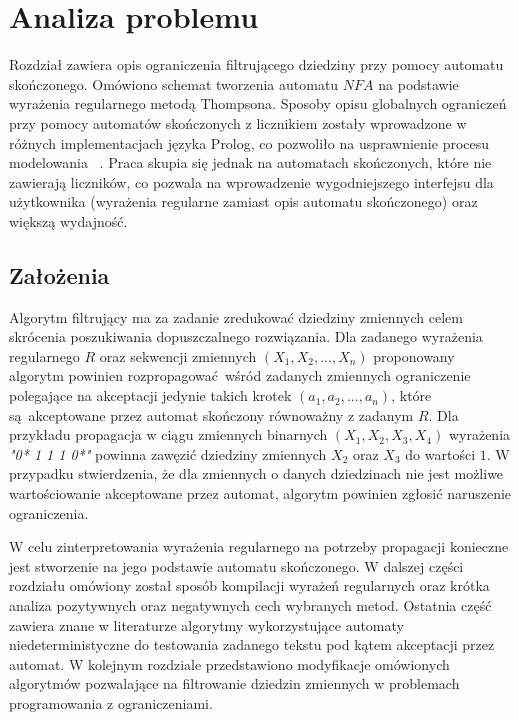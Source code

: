 \chapter{Analiza problemu}
\thispagestyle{chapterBeginStyle}
Rozdział zawiera opis ograniczenia filtrującego dziedziny przy pomocy automatu skończonego. Omówiono schemat tworzenia
automatu $NFA$ na podstawie wyrażenia regularnego metodą Thompsona. Sposoby opisu globalnych ograniczeń przy pomocy automatów
skończonych z licznikiem zostały wprowadzone w różnych implementacjach języka Prolog, co pozwoliło na usprawnienie procesu modelowania~
\cite{Automata}. Praca skupia się jednak na automatach skończonych, które nie zawierają liczników, co pozwala na wprowadzenie
wygodniejszego interfejsu dla użytkownika (wyrażenia regularne zamiast opis automatu skończonego) oraz większą wydajność.

\section{Założenia}
\par
Algorytm filtrujący ma za zadanie zredukować dziedziny zmiennych celem skrócenia poszukiwania dopuszczalnego rozwiązania.
Dla zadanego wyrażenia regularnego $R$ oraz sekwencji zmiennych $(X_1, X_2, ... , X_n)$ proponowany algorytm
powinien rozpropagować wśród zadanych zmiennych ograniczenie polegające na akceptacji jedynie takich krotek
$(a_1, a_2, ... , a_n)$, które są akceptowane przez automat skończony równoważny z zadanym $R$. Dla przykładu
propagacja w ciągu zmiennych binarnych $(X_1, X_2, X_3, X_4)$ wyrażenia \textit{"0* 1 1 1 0*"} powinna zawęzić dziedziny
zmiennych $X_2$ oraz $X_3$ do wartości $1$. W przypadku stwierdzenia, że dla zmiennych o danych dziedzinach nie jest
możliwe wartościowanie akceptowane przez automat, algorytm powinien zgłosić naruszenie ograniczenia.
\par
W celu zinterpretowania wyrażenia regularnego na potrzeby propagacji konieczne jest stworzenie na jego podstawie
automatu skończonego. W dalszej części rozdziału omówiony został sposób kompilacji wyrażeń regularnych oraz krótka analiza
pozytywnych oraz negatywnych cech wybranych metod. Ostatnia część zawiera znane w literaturze algorytmy
wykorzystujące automaty niedeterministyczne do testowania zadanego tekstu pod kątem akceptacji przez automat.
W kolejnym rozdziale przedstawiono modyfikacje omówionych algorytmów pozwalające na filtrowanie dziedzin zmiennych
w problemach programowania z ograniczeniami.


